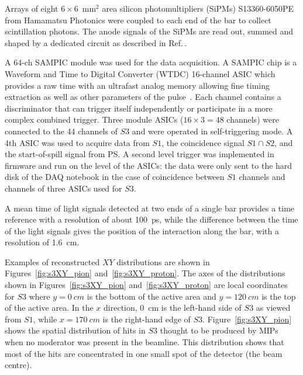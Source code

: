 Arrays of eight $6 \times 6$~mm$^2$ area silicon photomultipliers (SiPMs) S13360-6050PE from Hamamatsu Photonics \cite{Hamamatsu} were coupled to each end of the bar to collect scintillation photons.
The anode signals of the SiPMs are read out, summed and shaped by a dedicated circuit as described in Ref.\,\cite{S3-readout}.

A 64-ch SAMPIC  module was used for the data acquisition.
A SAMPIC chip is a Waveform and Time to Digital Converter (WTDC) 16-channel ASIC which provides a raw time with an ultrafast analog memory allowing fine timing extraction as well as other parameters of the pulse~\cite{SAMPIC}.
Each channel contains a discriminator that can trigger itself independently or participate in a more complex combined trigger. 
Three module ASICs ($16\times3=48$ channels) were connected to the 44 channels of $\mathit{S3}$ and were operated in self-triggering mode.
A 4th ASIC was used to acquire data from $\mathit{S1}$, the coincidence signal $\mathit{S1} \cap \mathit{S2}$, and the start-of-spill signal from PS.
A second level trigger was implemented in firmware and run on the level of the ASICs: the data were only sent to the hard disk of the DAQ notebook in the case of coincidence between $\mathit{S1}$ channels and channels of three ASICs used for $\mathit{S3}$.

A mean time of light signals detected at two ends of a single bar provides a time reference with a resolution of about 100~ps, while the difference between the time of the light signals gives the position of the interaction along the bar, with a resolution of 1.6~cm.

Examples of reconstructed $XY$ distributions are shown in Figures~\ref{fig:s3XY_pion} and~\ref{fig:s3XY_proton}.
The axes of the distributions shown in Figures~\ref{fig:s3XY_pion} and~\ref{fig:s3XY_proton} are local coordinates for $\mathit{S3}$ where $y=0~cm$ is the bottom of the active area and $y=120~cm$ is the top of the active area.
In the $x$ direction, 0~cm is the left-hand side of $\mathit{S3}$ as viewed from $\mathit{S1}$, while $x = 170~cm$ is the right-hand edge of $\mathit{S3}$.
Figure~\ref{fig:s3XY_pion} shows the spatial distribution of hits in $\mathit{S3}$ thought to be produced by MIPs when no moderator was present in the beamline.
This distribution shows that most of the hits are concentrated in one small spot of the detector (the beam centre).

